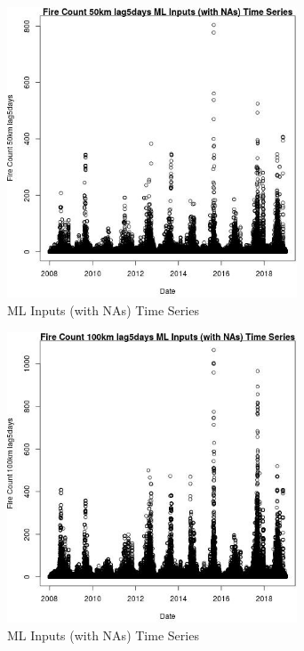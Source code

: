 \begin{figure} 
\centering  
\includegraphics[width=0.77\textwidth]{Code_Outputs/Report_ML_input_PM25_Step4_part_f_de_duplicated_aveswNAs_Fire_Count_50km_lag5daysvDate.jpg} 
\caption{\label{fig:Report_ML_input_PM25_Step4_part_f_de_duplicated_aveswNAsFire_Count_50km_lag5daysvDate}ML Inputs (with NAs) Time Series} 
\end{figure} 
 

\clearpage 

\begin{figure} 
\centering  
\includegraphics[width=0.77\textwidth]{Code_Outputs/Report_ML_input_PM25_Step4_part_f_de_duplicated_aveswNAs_Fire_Count_100km_lag5daysvDate.jpg} 
\caption{\label{fig:Report_ML_input_PM25_Step4_part_f_de_duplicated_aveswNAsFire_Count_100km_lag5daysvDate}ML Inputs (with NAs) Time Series} 
\end{figure} 
 

